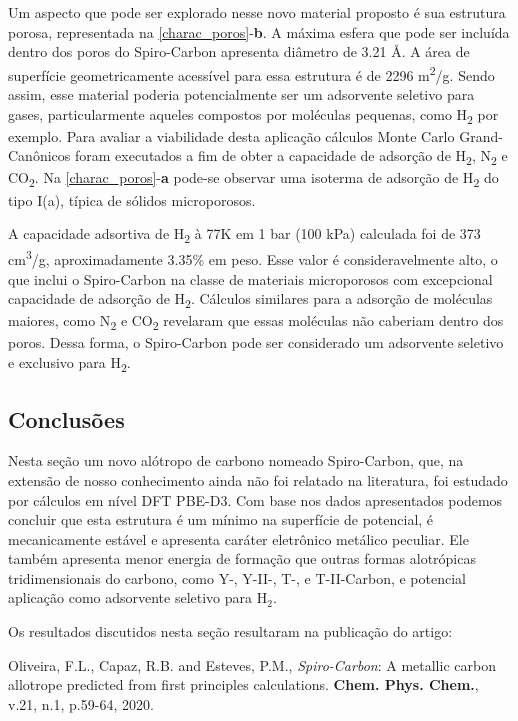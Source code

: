 	Um aspecto que pode ser explorado nesse novo material proposto é sua estrutura porosa, representada na \autoref{charac_poros}-\textbf{b}. A máxima esfera que pode ser incluída dentro dos poros do Spiro-Carbon apresenta diâmetro de 3.21 \AA{}. A área de superfície geometricamente acessível para essa estrutura é de 2296 m\textsuperscript{2}/g. Sendo assim, esse material poderia potencialmente ser um adsorvente seletivo para gases, particularmente aqueles compostos por moléculas pequenas, como H\textsubscript{2} por exemplo. Para avaliar a viabilidade desta aplicação cálculos Monte Carlo Grand-Canônicos foram executados a fim de obter a capacidade de adsorção de H\textsubscript{2}, N\textsubscript{2} e CO\textsubscript{2}. Na \autoref{charac_poros}-\textbf{a} pode-se observar uma isoterma de adsorção de H\textsubscript{2} do tipo I(a), típica de sólidos microporosos. \cite{thommes2015physisorption} 
	
	A capacidade adsortiva de H\textsubscript{2} à 77K em 1 bar (100 kPa) calculada foi de 373 cm\textsuperscript{3}/g, aproximadamente 3.35\% em peso. Esse valor é consideravelmente alto, o que inclui o Spiro-Carbon na classe de materiais microporosos com excepcional capacidade de adsorção de H\textsubscript{2}.  \cite{blankenship2017cigarette, wong2006exceptional} Cálculos similares para a adsorção de moléculas maiores, como N\textsubscript{2} e CO\textsubscript{2} revelaram que essas moléculas não caberiam dentro dos poros. Dessa forma, o Spiro-Carbon pode ser considerado um adsorvente seletivo e exclusivo para H\textsubscript{2}.
	
	\subsection{Conclusões}
	
		Nesta seção um novo alótropo de carbono nomeado Spiro-Carbon, que, na extensão de nosso conhecimento ainda não foi relatado na literatura, foi estudado por cálculos em nível DFT PBE-D3. Com base nos dados apresentados podemos concluir que esta estrutura é um mínimo na superfície de potencial, é mecanicamente estável e apresenta caráter eletrônico metálico peculiar. Ele também apresenta menor energia de formação que outras formas alotrópicas tridimensionais do carbono, como Y-, Y-II-, T-, e T-II-Carbon, e potencial aplicação como adsorvente seletivo para H$_2$.  
		
		Os resultados discutidos nesta seção resultaram na publicação do artigo:
		
		\begin{citacao}
			Oliveira, F.L., Capaz, R.B. and Esteves, P.M., \textit{Spiro-Carbon}: A metallic carbon allotrope predicted from first principles calculations. \textbf{Chem. Phys. Chem.}, v.21, n.1, p.59-64, 2020.
		\end{citacao}
		
